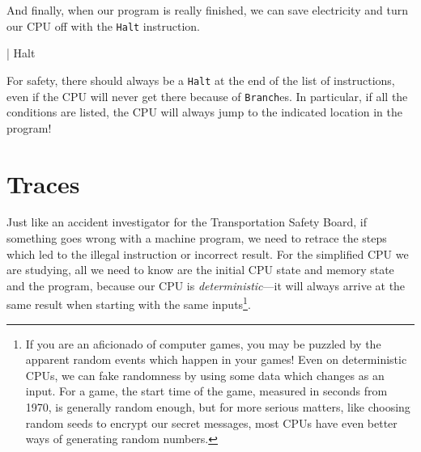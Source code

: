 \documentclass[12pt]{amsbook}
\begin{document}
{And finally, when our program is really finished, we can save electricity and turn our CPU off with the \texttt{Halt} instruction.
\begin{code}
                  | Halt
\end{code}
For safety, there should always be a \texttt{Halt} at the end of the list of instructions, even if the CPU will never get there because of \texttt{Branch}es.  In particular, if all the conditions are listed, the CPU will always jump to the indicated location in the program!

\section{Traces}
%
Just like an accident investigator for the Transportation Safety Board,
if something goes wrong with a machine program, 
we need to retrace the steps which led to the illegal instruction or incorrect result.
For the simplified CPU we are studying, 
all we need to know are the initial CPU state and memory state and the program,
because our CPU is \emph{deterministic}---it will always arrive at the same result when starting with the same inputs\footnote{If you are an aficionado of computer games, you may be puzzled by the apparent random events which happen in your games!  Even on deterministic CPUs, we can fake randomness by using some data which changes as an input.  For a game, the start time of the game, measured in seconds from 1970, is generally random enough, but for more serious matters, like choosing random seeds to encrypt our secret messages, most CPUs have even better ways of generating random numbers.}.

}
\end{document}
